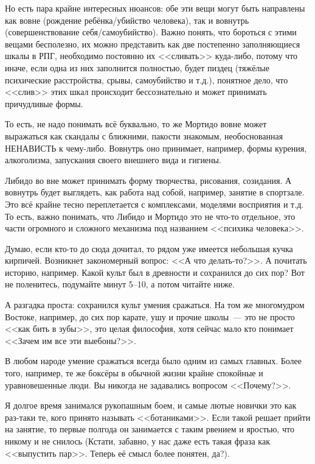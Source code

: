 \documentclass[a5paper,12pt,twoside]{memoir}
\begin{document}
Но есть пара крайне интересных нюансов: обе эти вещи могут быть направлены как вовне (рождение ребёнка/убийство человека), так и вовнутрь (совершенствование себя/самоубийство). Важно понять, что бороться с этими вещами бесполезно, их можно представить как две постепенно заполняющиеся шкалы в РПГ, необходимо постоянно их <<сливать>> куда-либо, потому что иначе, если одна из них заполнится полностью, будет пиздец (тяжёлые психические расстройства, срывы, самоубийство и т.д.), понятное дело, что <<слив>> этих шкал происходит бессознательно и может принимать причудливые формы. 

То есть, не надо понимать всё буквально, то же Мортидо вовне может выражаться как скандалы с ближними, пакости знакомым, необоснованная НЕ\-НА\-ВИСТЬ к чему-либо. Вовнутрь оно принимает, например, формы курения, алкоголизма, запускания своего внешнего вида и гигиены. 

Либидо во вне может принимать форму творчества, рисования, созидания. А вовнутрь будет выглядеть, как работа над собой, например, занятие в спортзале. Это всё крайне тесно переплетается с комплексами, моделями восприятия и т.д. То есть, важно понимать, что Либидо и Мортидо это не что-то отдельное, это части огромного и сложного механизма под названием <<психика человека>>. 

Думаю, если кто-то до сюда дочитал, то рядом уже имеется небольшая кучка кирпичей. Возникнет закономерный вопрос: <<А что делать-то?>>. А почитать историю, например. Какой культ был в древности и сохранился до сих пор? Вот не поленитесь, подумайте минут 5--10, а потом читайте ниже. 

А разгадка проста: сохранился культ умения сражаться. На том же многомудром Востоке, например, до сих пор карате, ушу и прочие школы~--- это не просто <<как бить в зубы>>, это целая философия, хотя сейчас мало кто понимает <<Зачем им все эти выебоны?>>.
 
В любом народе умение сражаться всегда было одним из самых главных. Более того, например, те же боксёры в обычной жизни крайне спокойные и уравновешенные люди. Вы никогда не задавались вопросом <<Почему?>>.

Я долгое время занимался рукопашным боем, и самые лютые новички это как раз-таки те, кого принято называть <<ботаниками>>. Если такой решает прийти на занятие, то первые полгода он занимается с таким рвением и яростью, что никому и не снилось (Кстати, забавно, у нас даже есть такая фраза как <<выпустить пар>>. Теперь её смысл более понятен, да?).
\end{document}
